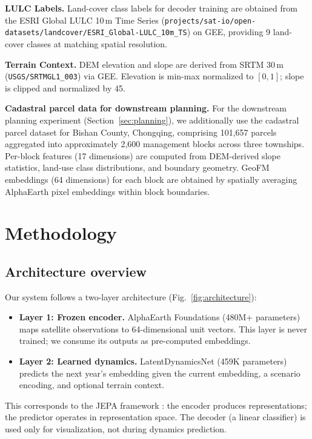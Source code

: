\documentclass{article}
\begin{document}
\textbf{LULC Labels.} Land-cover class labels for decoder training are obtained from the ESRI Global LULC 10\,m Time Series (\texttt{projects/sat-io/open-datasets/landcover/ESRI\_Global-LULC\_10m\_TS}) on GEE, providing 9 land-cover classes at matching spatial resolution.

\textbf{Terrain Context.} DEM elevation and slope are derived from SRTM 30\,m (\texttt{USGS/SRTMGL1\_003}) via GEE. Elevation is min-max normalized to $[0,1]$; slope is clipped and normalized by 45\textdegree.

\textbf{Cadastral parcel data for downstream planning.} For the downstream planning experiment (Section~\ref{sec:planning}), we additionally use the cadastral parcel dataset for Bishan County, Chongqing, comprising 101{,}657 parcels aggregated into approximately 2{,}600 management blocks across three townships. Per-block features (17 dimensions) are computed from DEM-derived slope statistics, land-use class distributions, and boundary geometry. GeoFM embeddings (64 dimensions) for each block are obtained by spatially averaging AlphaEarth pixel embeddings within block boundaries.


\section{Methodology}
\label{sec:method}

\subsection{Architecture overview}

Our system follows a two-layer architecture (Fig.~\ref{fig:architecture}):

\begin{itemize}
\item \textbf{Layer 1: Frozen encoder.} AlphaEarth Foundations (480M+ parameters) maps satellite observations to 64-dimensional unit vectors. This layer is never trained; we consume its outputs as pre-computed embeddings.
\item \textbf{Layer 2: Learned dynamics.} LatentDynamicsNet (459K parameters) predicts the next year's embedding given the current embedding, a scenario encoding, and optional terrain context.
\end{itemize}

This corresponds to the JEPA framework \citep{lecun2022jepa}: the encoder produces representations; the predictor operates in representation space. The decoder (a linear classifier) is used only for visualization, not during dynamics prediction.
\end{document}

